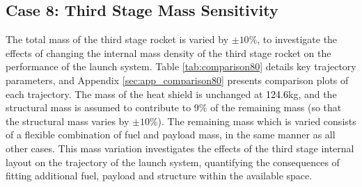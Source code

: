 \subsection{Case 8: Third Stage Mass Sensitivity}\label{sec:m3noReturn}


The total mass of the third stage rocket is varied by $\pm10\%$, to investigate the effects of changing the internal mass density of the third stage rocket on the performance of the launch system. Table \ref{tab:comparison80} details key trajectory parameters, and Appendix \ref{sec:app_comparison80} presents comparison plots of each trajectory.
The mass of the heat shield is unchanged at \textcolor{black}{124.6}kg, and the structural mass is assumed to contribute to 9\% of the remaining mass (so that the structural mass varies by $\pm10\%$). The remaining mass which is varied consists of a flexible combination of fuel and payload mass, in the same manner as all other cases. 
This mass variation investigates the effects of the third stage internal layout on the trajectory of the launch system, quantifying the consequences of fitting additional fuel, payload and structure within the available space.


